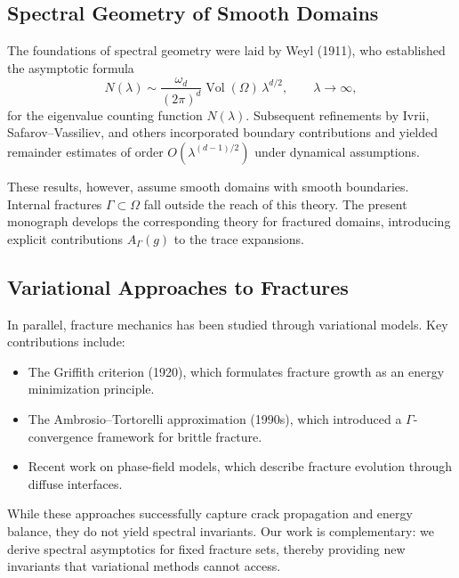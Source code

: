 \subsection{Spectral Geometry of Smooth Domains}

The foundations of spectral geometry were laid by Weyl (1911), who established
the asymptotic formula
\[
N(\lambda) \sim \frac{\omega_d}{(2\pi)^d} \operatorname{Vol}(\Omega)\,
\lambda^{d/2}, \qquad \lambda \to \infty,
\]
for the eigenvalue counting function $N(\lambda)$. Subsequent refinements by
Ivrii, Safarov--Vassiliev, and others incorporated boundary contributions and
yielded remainder estimates of order $O(\lambda^{(d-1)/2})$ under dynamical
assumptions.

These results, however, assume smooth domains with smooth boundaries. Internal
fractures $\Gamma\subset\Omega$ fall outside the reach of this theory. The
present monograph develops the corresponding theory for fractured domains,
introducing explicit contributions $A_\Gamma(g)$ to the trace expansions.

\subsection{Variational Approaches to Fractures}

In parallel, fracture mechanics has been studied through variational models.
Key contributions include:

\begin{itemize}
  \item The Griffith criterion (1920), which formulates fracture growth as an
  energy minimization principle.
  \item The Ambrosio--Tortorelli approximation (1990s), which introduced a
  $\Gamma$-convergence framework for brittle fracture.
  \item Recent work on phase-field models, which describe fracture evolution
  through diffuse interfaces.
\end{itemize}

While these approaches successfully capture crack propagation and energy
balance, they do not yield spectral invariants. Our work is complementary: we
derive spectral asymptotics for fixed fracture sets, thereby providing new
invariants that variational methods cannot access.

